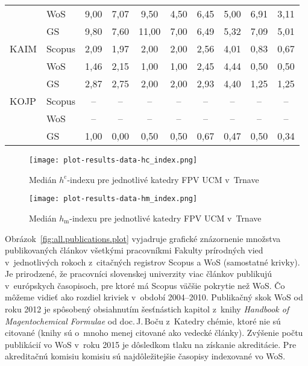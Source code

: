 \begin{table}
\begin{tabular}{llcccccccc}
      & WoS    & 9,00     & 7,07 & 9,50  & 4,50 & 6,45     & 5,00 & 6,91 & 3,11 \\
      & GS     & 9,80     & 7,60 & 11,00 & 7,00 & 6,49     & 5,32 & 7,09 & 5,01 \\[1ex]
 KAIM & Scopus & 2,09     & 1,97 & 2,00  & 2,00 & 2,56     & 4,01 & 0,83 & 0,67 \\
      & WoS    & 1,46     & 2,15 & 1,00  & 1,00 & 2,45     & 4,44 & 0,50 & 0,50 \\
      & GS     & 2,87     & 2,75 & 2,00  & 2,00 & 2,93     & 4,40 & 1,25 & 1,25 \\[1ex]
 KOJP & Scopus & --       & --   & --    & --   & --       & --   & --   & --   \\
      & WoS    & --       & --   & --    & --   & --       & --   & --   & --   \\
      & GS     & 1,00     & 0,00 & 0,50  & 0,50 & 0,67     & 0,47 & 0,50 & 0,34 \\[0.5ex]
  \bottomrule
\end{tabular}
\end{table}

\begin{figure}
  \centering
  \texttt{[image: plot-results-data-hc\_index.png]}
  \caption{Medián $h^\mathrm{c}$-indexu pre jednotlivé katedry FPV UCM v~Trnave}
  \label{fig:hc-index.plot}
\end{figure}

\begin{figure}
  \centering
  \texttt{[image: plot-results-data-hm\_index.png]}
  \caption{Medián $h_\mathrm{m}$-indexu pre jednotlivé katedry FPV UCM v~Trnave}
  \label{fig:hm-index.plot}
\end{figure}



Obrázok~\ref{fig:all.publications.plot} vyjadruje grafické znázornenie množstva
publikovaných článkov všetkými pracovníkmi Fakulty prírodných vied
v~jednotlivých rokoch z~citačných registrov Scopus a WoS (samostatné krivky).
Je prirodzené, že pracovníci slovenskej univerzity viac článkov publikujú
v~európskych časopisoch, pre ktoré má Scopus väčšie pokrytie než WoS.  Čo môžeme
vidieť ako rozdiel kriviek v~období 2004--2010.  Publikačný skok WoS od roku
2012 je spôsobený obsiahnutím šesťnástich kapitol z~knihy \emph{Handbook of
  Magentochemical Formulae} od doc.\,J.\,Boču z~Katedry chémie, ktoré nie sú
citované (knihy sú o~mnoho menej citované ako vedecké články).  Zvýšenie počtu
publikácií vo WoS v~roku 2015 je dôsledkom tlaku na získanie akreditácie.  Pre
akreditačnú komisiu komisiu sú najdôležitejšie časopisy indexované vo WoS.

